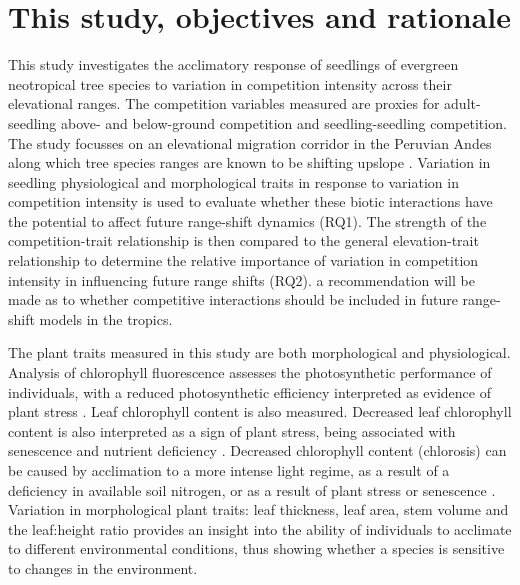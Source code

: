 \documentclass[a4paper,10pt,]{report}
\begin{document}
\section{This study, objectives and rationale}
This study investigates the acclimatory response of seedlings of evergreen neotropical tree species to variation in competition intensity across their elevational ranges. The competition variables measured are proxies for adult-seedling above- and below-ground competition and seedling-seedling competition. The study focusses on an elevational migration corridor in the Peruvian Andes along which tree species ranges are known to be shifting upslope \citep{Feeley2011}. Variation in seedling physiological and morphological traits in response to variation in competition intensity is used to evaluate whether these biotic interactions have the potential to affect future range-shift dynamics (RQ1). The strength of the competition-trait relationship is then compared to the general elevation-trait relationship to determine the relative importance of variation in competition intensity in influencing future range shifts (RQ2). a recommendation will be made as to whether competitive interactions should be included in future range-shift models in the tropics.

The plant traits measured in this study are both morphological and physiological. Analysis of chlorophyll fluorescence assesses the photosynthetic performance of individuals, with a reduced photosynthetic efficiency interpreted as evidence of plant stress \citep{Ashraf2013}. Leaf chlorophyll content is also measured. Decreased leaf chlorophyll content is also interpreted as a sign of plant stress, being associated with senescence and nutrient deficiency \citep{Gitelson2003}. Decreased chlorophyll content (chlorosis) can be caused by acclimation to a more intense light regime, as a result of a deficiency in available soil nitrogen, or as a result of plant stress or senescence \citep{Ashraf2013}. Variation in morphological plant traits: leaf thickness, leaf area, stem volume and the leaf:height ratio provides an insight into the ability of individuals to acclimate to different environmental conditions, thus showing whether a species is sensitive to changes in the environment.

\end{document}
